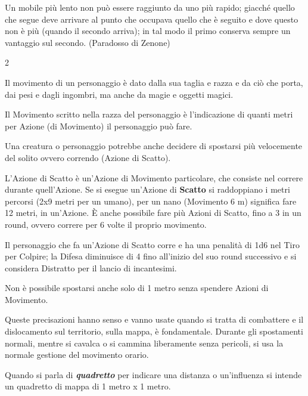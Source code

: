 \begin{enfasi}{Un mobile più lento non può essere raggiunto da uno più rapido; giacché quello che segue deve arrivare al punto che occupava quello che è seguito e dove questo non è più (quando il secondo arriva); in tal modo il primo conserva sempre un vantaggio sul secondo. (Paradosso di Zenone)}
\end{enfasi}

\begin{multicols}{2}

Il movimento di un personaggio è dato dalla sua taglia e razza e da ciò che porta, dai pesi e dagli ingombri, ma anche da magie e oggetti magici.

Il Movimento scritto nella razza del personaggio è l'indicazione di quanti metri per Azione (di Movimento) il personaggio può fare.

Una creatura o personaggio potrebbe anche decidere di spostarsi più velocemente del solito ovvero correndo (Azione di Scatto).\label{azionediscatto}\hypertarget{azionediscatto}{}

L'Azione di Scatto è un'Azione di Movimento particolare, che consiste nel correre durante quell'Azione.
Se si esegue un'Azione di \textbf{Scatto} si raddoppiano i metri percorsi (2x9 metri per un umano), per un nano (Movimento 6 m) significa fare 12 metri, in un'Azione.
È anche possibile fare più Azioni di Scatto, fino a 3 in un round, ovvero correre per 6 volte il proprio movimento.

Il personaggio che fa un'Azione di Scatto  corre e ha una penalità di 1d6 nel Tiro per Colpire; la Difesa diminuisce di 4 fino all'inizio del suo round successivo e si considera Distratto per il lancio di incantesimi.

Non è possibile spostarsi anche solo di 1 metro senza spendere Azioni di Movimento.

Queste precisazioni hanno senso e vanno usate quando si tratta di combattere e il dislocamento sul territorio, sulla mappa, è fondamentale. Durante gli spostamenti normali, mentre si cavalca o si cammina liberamente senza pericoli, si usa la normale gestione del movimento orario.

Quando si parla di \textbf{\emph{quadretto}}  per indicare una distanza o un'influenza si intende un quadretto di mappa di 1 metro x 1 metro.



\end{multicols}
